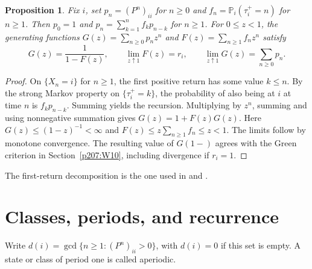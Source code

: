 \documentclass[11pt,oneside,openany]{book}
\theoremstyle{plain}
\newtheorem{proposition}[theorem]{Proposition}
\theoremstyle{definition}
\theoremstyle{remark}
\begin{document}
\begin{proposition}
Fix \(i\), set \(p_n=(P^n)_{ii}\) for \(n\ge0\) and
\(f_n=\mathbb P_i(\tau_i^+=n)\) for \(n\ge1\). Then \(p_0=1\) and
\(p_n=\sum_{k=1}^n f_kp_{n-k}\) for \(n\ge1\).
For \(0\le z<1\), the generating functions
\(G(z)=\sum_{n\ge0}p_nz^n\) and \(F(z)=\sum_{n\ge1}f_nz^n\) satisfy
\[
 G(z)=\frac{1}{1-F(z)},\qquad
 \lim_{z\uparrow1}F(z)=r_i,\qquad
 \lim_{z\uparrow1}G(z)=\sum_{n\ge0}p_n.
\]
\end{proposition}
\begin{proof}
On \(\{X_n=i\}\) for \(n\ge1\), the first positive return has some
value \(k\le n\). By the strong Markov property on
\(\{\tau_i^+=k\}\), the probability of also being at \(i\) at time
\(n\) is \(f_kp_{n-k}\). Summing yields the recursion.
Multiplying by \(z^n\), summing and using nonnegative summation
gives \(G(z)=1+F(z)G(z)\). Here \(G(z)\le(1-z)^{-1}<\infty\)
and \(F(z)\le z\sum_{n\ge1}f_n\le z<1\).
The limits follow by monotone convergence. The resulting value
of \(G(1-)\) agrees with the Green criterion in
Section~\ref{p207:W10}, including divergence if \(r_i=1\).
\end{proof}

The first-return decomposition is the one used in
\cite[Section 1.5]{Norris} and \cite[Section 5.3]{Durrett}.

\section{Classes, periods, and recurrence}
\label{p207:W12}

Write \(d(i)=\gcd\{n\ge1:(P^n)_{ii}>0\}\), with \(d(i)=0\) if this
set is empty. A state or class of period one is called aperiodic.
\end{document}
